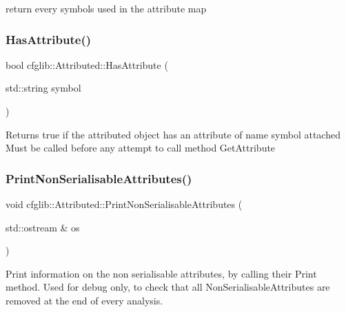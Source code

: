 return every symbols used in the attribute map \mbox{\label{classcfglib_1_1Attributed_a7a9a828f1cd9fcd11bfcb5bed166d132}} 
\subsubsection{\texorpdfstring{Has\+Attribute()}{HasAttribute()}}
{\footnotesize\ttfamily bool cfglib\+::\+Attributed\+::\+Has\+Attribute (\begin{DoxyParamCaption}\item[{std\+::string}]{symbol }\end{DoxyParamCaption})}

Returns true if the attributed object has an attribute of name \textquotesingle{}symbol\textquotesingle{} attached Must be called before any attempt to call method Get\+Attribute \mbox{\label{classcfglib_1_1Attributed_a8952d975e36fc5d1a824ff0d27dfc0df}} 
\subsubsection{\texorpdfstring{Print\+Non\+Serialisable\+Attributes()}{PrintNonSerialisableAttributes()}}
{\footnotesize\ttfamily void cfglib\+::\+Attributed\+::\+Print\+Non\+Serialisable\+Attributes (\begin{DoxyParamCaption}\item[{std\+::ostream \&}]{os }\end{DoxyParamCaption})}

Print information on the non serialisable attributes, by calling their Print method. Used for debug only, to check that all Non\+Serialisable\+Attributes are removed at the end of every analysis. \mbox{\label{classcfglib_1_1Attributed_afd7bf0f8c2321dbd5c7206ece7da1393}} 
